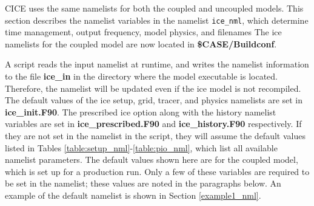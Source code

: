 
CICE uses the same namelists for both the coupled and uncoupled models.
This section describes the namelist variables in the namelist {\tt ice\_nml},
which determine time management, output frequency, model physics, and filenames
The ice namelists for the coupled model are now located in
{\bf \$CASE/Buildconf}.  

A script reads the input namelist at runtime, and writes the namelist
information to the file {\bf ice\_in} in the directory where the model 
executable is located.  Therefore, the namelist will be updated even if the 
ice model is not recompiled.  The default values of the ice setup, grid, 
tracer, and physics namelists are set in {\bf ice\_init.F90}.  The prescribed
ice option along with the history namelist variables are set
in {\bf ice\_prescribed.F90} and {\bf ice\_history.F90} respectively. 
If they are not set in the namelist 
in the script, they will assume the default values listed in 
Tables \ref{table:setup_nml}-\ref{table:pio_nml}, which list all available 
namelist parameters.  The default values shown here are
for the coupled model, which is set up for a production run. Only a few of 
these variables are required to be set in the namelist; these values are 
noted in the paragraphs below.  An example of the default namelist is shown in 
Section \ref{example1_nml}.

